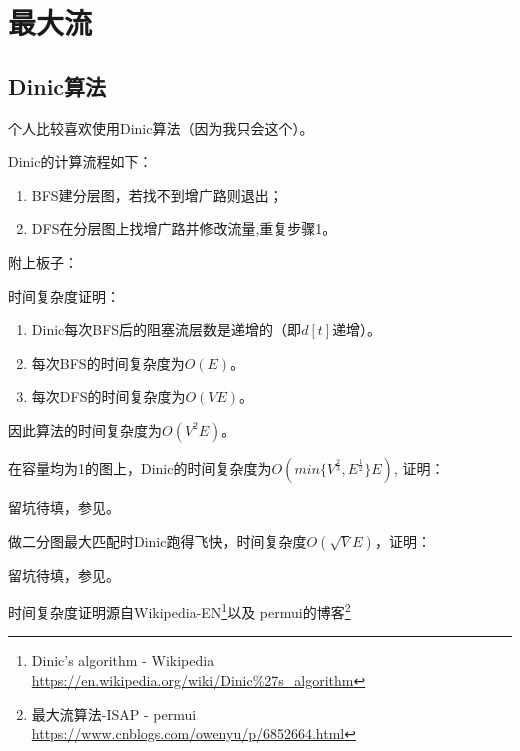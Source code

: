 \section{最大流}
\subsection{Dinic算法}
个人比较喜欢使用Dinic算法（因为我只会这个）。

Dinic的计算流程如下：
\begin{enumerate}
	\item BFS建分层图，若找不到增广路则退出；
	\item DFS在分层图上找增广路并修改流量,重复步骤1。
\end{enumerate}

附上板子：


时间复杂度证明：

\begin{enumerate}
	\item \begin{lemma}
		Dinic每次BFS后的阻塞流层数是递增的（即$d[t]$递增）。
	\end{lemma}
	\item 每次BFS的时间复杂度为$O(E)$。
	\item 每次DFS的时间复杂度为$O(VE)$。
\end{enumerate}

因此算法的时间复杂度为$O(V^2E)$。

在容量均为1的图上，Dinic的时间复杂度为$O(min \{ V^\frac{2}{3},E^\frac{1}{2} \} E)$,
证明：

留坑待填，参见\cite{NFTGC}。

做二分图最大匹配时Dinic跑得飞快，时间复杂度$O(\sqrt V E)$，证明：

留坑待填，参见\cite{DSNA}。


时间复杂度证明源自Wikipedia-EN\footnote{
	Dinic's algorithm - Wikipedia
	\url{https://en.wikipedia.org/wiki/Dinic\%27s\_algorithm}}以及
	permui的博客\footnote{ 最大流算法-ISAP - permui
		\url{https://www.cnblogs.com/owenyu/p/6852664.html}}

